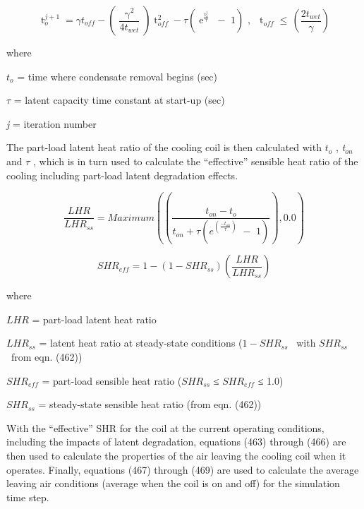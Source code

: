 \begin{equation}
\mathop t\nolimits_o^{j + 1}  = \gamma {t_{off}} - \left( {\frac{{\mathop \gamma \nolimits^2 }}{{4{t_{wet}}}}} \right)\mathop t\nolimits_{off}^2  - \tau \left( {\mathop e\nolimits^{\frac{{\mathop t\nolimits_o^j }}{\tau }} \,\, - \,\,1} \right)\,\,,\,\,\,\mathop t\nolimits_{off}^{}  \le \,\left( {\frac{{2{t_{wet}}}}{\gamma }} \right)
\end{equation}

where

\({t_o}\) = time where condensate removal begins (sec)

\(\tau\) = latent capacity time constant at start-up (sec)

\emph{j} = iteration number

The part-load latent heat ratio of the cooling coil is then calculated with \(t_o\) , \emph{t\(_{on}\)} and \(\tau\) , which is in turn used to calculate the ``effective'' sensible heat ratio of the cooling including part-load latent degradation effects.

\begin{equation}
\frac{{LHR}}{{LH{R_{ss}}}} = Maximum\left( {\left( {\frac{{{t_{on}} - {t_o}}}{{{t_{on}} + \tau \left( {{e^{\left( {\frac{{ - {t_{on}}}}{\tau }} \right)}}\,\, - \,\,1} \right)}}} \right),0.0} \right)
\end{equation}

\begin{equation}
SH{R_{eff}} = 1 - \left( {1 - SH{R_{ss}}} \right)\left( {\frac{{LHR}}{{LH{R_{ss}}}}} \right)
\end{equation}

where

\(LHR\) = part-load latent heat ratio

\(LH{R_{ss}}\) = latent heat ratio at steady-state conditions (\(1 - SH{R_{ss}}\) ~with \(SH{R_{ss}}\) ~from eqn. (462))

\(SH{R_{eff}}\) = part-load sensible heat ratio (\(SH{R_{ss}}\) ≤ \(SH{R_{eff}}\) ≤ 1.0)

\(SH{R_{ss}}\) = steady-state sensible heat ratio (from eqn. (462))

With the ``effective'' SHR for the coil at the current operating conditions, including the impacts of latent degradation, equations (463) through (466) are then used to calculate the properties of the air leaving the cooling coil when it operates. Finally, equations (467) through (469) are used to calculate the average leaving air conditions (average when the coil is on and off) for the simulation time step.

